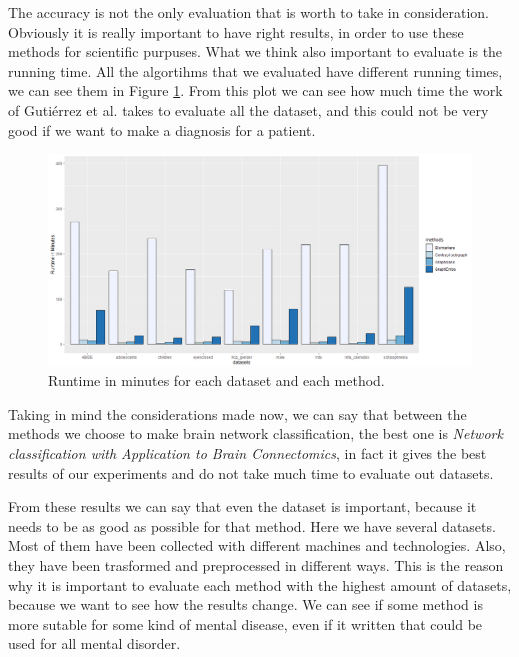 The accuracy is not the only evaluation that is worth to take in consideration. Obviously it is really important to have right results, in order to use these methods for scientific purpuses. What we think also important to evaluate is the running time. All the algortihms that we evaluated have different running times, we can see them in Figure \ref{fig:diagram21}. From this plot we can see how much time the work of Guti\'{e}rrez et al. \cite{GutierrezBio} takes to evaluate all the dataset, and this could not be very good if we want to make a diagnosis for a patient. 
\vspace{0.5cm}

\begin{figure}[htbp]
	\centering
	\includegraphics[scale=0.3]{Immagini/runtimes_w.png}
	\caption{Runtime in minutes for each dataset and each method.}
	\label{fig:diagram21}
\end{figure}

Taking in mind the considerations made now, we can say that between the methods we choose to make brain network classification, the best one is \textit{Network classification with Application to Brain Connectomics}, in fact it gives the best results of our experiments and do not take much time to evaluate out datasets.

From these results we can say that even the dataset is important, because it needs to be as good as possible for that method. Here we have several datasets. Most of them have been collected with different machines and technologies. Also, they have been trasformed and preprocessed in different ways. This is the reason why it is important to evaluate each method with the highest amount of datasets, because we want to see how the results change. We can see if some method is more sutable for some kind of mental disease, even if it written that could be used for all mental disorder.
